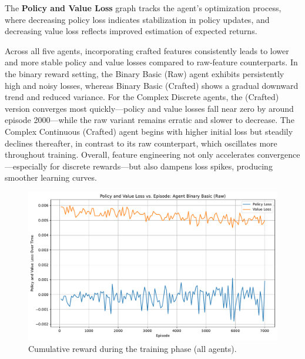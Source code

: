 \documentclass[sigconf]{acmart}
\begin{document}
The \textbf{Policy and Value Loss} graph tracks the agent's optimization process, where decreasing policy loss indicates stabilization in policy updates, and decreasing value loss reflects improved estimation of expected returns. 

\bigskip

Across all five agents, incorporating crafted features consistently leads to lower and more stable policy and value losses compared to raw‐feature counterparts. In the binary reward setting, the Binary Basic (Raw) agent exhibits persistently high and noisy losses, whereas Binary Basic (Crafted) shows a gradual downward trend and reduced variance. For the Complex Discrete agents, the (Crafted) version converges most quickly—policy and value losses fall near zero by around episode 2000—while the raw variant remains erratic and slower to decrease. The Complex Continuous (Crafted) agent begins with higher initial loss but steadily declines thereafter, in contrast to its raw counterpart, which oscillates more throughout training. Overall, feature engineering not only accelerates convergence—especially for discrete rewards—but also dampens loss spikes, producing smoother learning curves.

\bigskip

\begin{figure}[t]
  \centering
  \includegraphics[width=\textwidth]{policy_value_loss_Binary Basic (Raw).pdf}
  \caption{Cumulative reward during the training phase (all agents).}
  \label{fig:policy_value_loss_Binary Basic (Raw)}
\end{figure}
\end{document}
